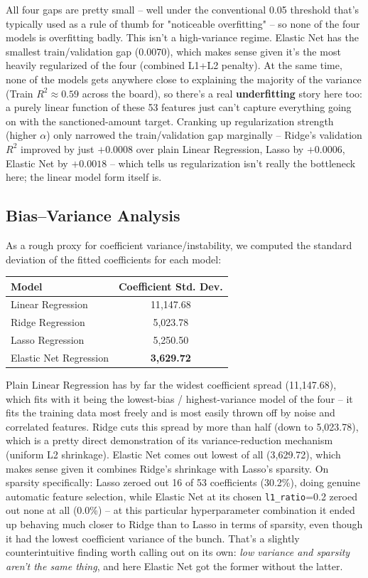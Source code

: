 \documentclass[12pt,a4paper]{article}
\begin{document}
All four gaps are pretty small -- well under the conventional 0.05 threshold that's typically used as a rule of thumb for "noticeable overfitting" -- so none of the four models is overfitting badly. This isn't a high-variance regime. Elastic Net has the smallest train/validation gap (0.0070), which makes sense given it's the most heavily regularized of the four (combined L1+L2 penalty). At the same time, none of the models gets anywhere close to explaining the majority of the variance (Train $R^2 \approx 0.59$ across the board), so there's a real \textbf{underfitting} story here too: a purely linear function of these 53 features just can't capture everything going on with the sanctioned-amount target. Cranking up regularization strength (higher $\alpha$) only narrowed the train/validation gap marginally -- Ridge's validation $R^2$ improved by just $+0.0008$ over plain Linear Regression, Lasso by $+0.0006$, Elastic Net by $+0.0018$ -- which tells us regularization isn't really the bottleneck here; the linear model form itself is.

\subsection*{Bias--Variance Analysis}
As a rough proxy for coefficient variance/instability, we computed the standard deviation of the fitted coefficients for each model:

\begin{center}
\begin{tabular}{lc}
\toprule
Model & Coefficient Std. Dev. \\
\midrule
Linear Regression & 11{,}147.68 \\
Ridge Regression & 5{,}023.78 \\
Lasso Regression & 5{,}250.50 \\
Elastic Net Regression & \textbf{3{,}629.72} \\
\bottomrule
\end{tabular}
\end{center}

Plain Linear Regression has by far the widest coefficient spread (11{,}147.68), which fits with it being the lowest-bias / highest-variance model of the four -- it fits the training data most freely and is most easily thrown off by noise and correlated features. Ridge cuts this spread by more than half (down to 5{,}023.78), which is a pretty direct demonstration of its variance-reduction mechanism (uniform L2 shrinkage). Elastic Net comes out lowest of all (3{,}629.72), which makes sense given it combines Ridge's shrinkage with Lasso's sparsity. On sparsity specifically: Lasso zeroed out 16 of 53 coefficients (30.2\%), doing genuine automatic feature selection, while Elastic Net at its chosen \texttt{l1\_ratio}=0.2 zeroed out none at all (0.0\%) -- at this particular hyperparameter combination it ended up behaving much closer to Ridge than to Lasso in terms of sparsity, even though it had the lowest coefficient variance of the bunch. That's a slightly counterintuitive finding worth calling out on its own: \textit{low variance and sparsity aren't the same thing}, and here Elastic Net got the former without the latter.
\end{document}
